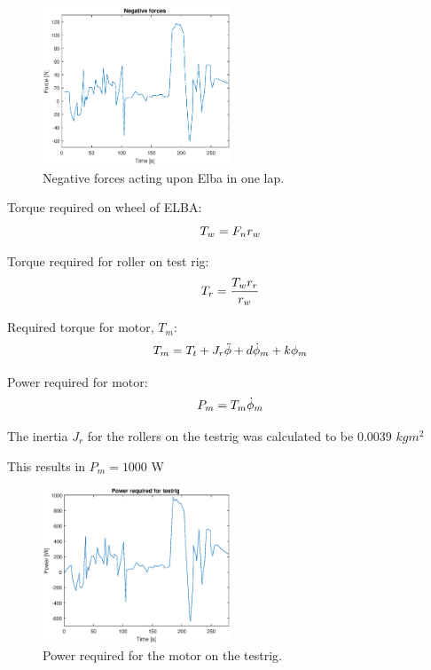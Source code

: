 \begin{figure}[H]
    \label{fig:testrig_negative_forces}
    \centering
    \includegraphics[width=0.5\textwidth]{./img/testrig_negative_forces.eps}
    \caption{Negative forces acting upon Elba in one lap.}
\end{figure}

Torque required on wheel of ELBA:$$T_w = F_n\*r_w$$

Torque required for roller on test rig: $$T_r = \frac{T_w\*r_r}{r_w}$$

Required torque for motor, $T_m$: $$T_m = T_t + J_r\*\ddot{\phi} + d\*\dot{\phi}_m + k\*\phi_m$$

Power required for motor: $$P_m = T_m\*\dot{\phi}_m$$

The inertia $J_r$ for the rollers on the testrig was calculated to be $0.0039$ $kgm^2$

This results in $P_m = 1000$ W

\begin{figure}[H]
    \label{fig:testrig_power_required}
    \centering
    \includegraphics[width=0.5\textwidth]{./img/testrig_power_required.eps}
    \caption{Power required for the motor on the testrig.}
\end{figure}
